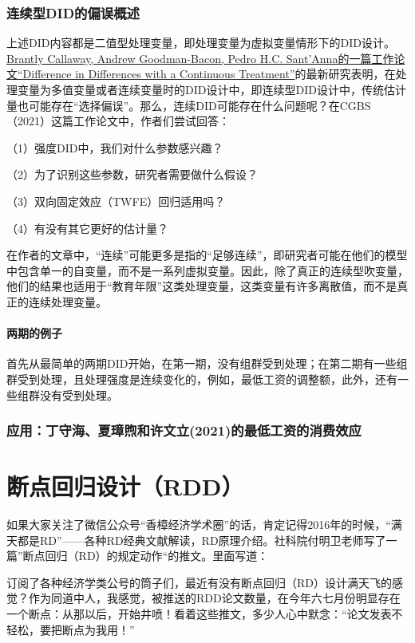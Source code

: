 \documentclass[cn,12pt,math=newtx,citestyle=gb7714-2015,bibstyle=gb7714-2015]{elegantbook}
\begin{document}
  \subsection{连续型DID的偏误概述}
  上述DID内容都是二值型处理变量，即处理变量为虚拟变量情形下的DID设计。\href{https://arxiv.org/abs/2107.02637}{Brantly Callaway, Andrew Goodman-Bacon, Pedro H.C. Sant'Anna的一篇工作论文“Difference in Differences with a Continuous Treatment”}的最新研究表明，在处理变量为多值变量或者连续变量时的DID设计中，即连续型DID设计中，传统估计量也可能存在“选择偏误”。那么，连续DID可能存在什么问题呢？在CGBS（2021）这篇工作论文中，作者们尝试回答：
  
  （1）强度DID中，我们对什么参数感兴趣？
  
  （2）为了识别这些参数，研究者需要做什么假设？
  
  （3）双向固定效应（TWFE）回归适用吗？
  
  （4）有没有其它更好的估计量？
  
  在作者的文章中，“连续”可能更多是指的“足够连续”，即研究者可能在他们的模型中包含单一的自变量，而不是一系列虚拟变量。因此，除了真正的连续型吹变量，他们的结果也适用于“教育年限”这类处理变量，这类变量有许多离散值，而不是真正的连续处理变量。
  
  \subsubsection{两期的例子}
  首先从最简单的两期DID开始，在第一期，没有组群受到处理；在第二期有一些组群受到处理，且处理强度是连续变化的，例如，最低工资的调整额，此外，还有一些组群没有受到处理。
  

  
  \subsection{应用：丁守海、夏璋煦和许文立(2021)的最低工资的消费效应}
  
  
  


	\chapter{断点回归设计（RDD）}
	
	如果大家关注了微信公众号“香樟经济学术圈”的话，肯定记得2016年的时候，“满天都是RD”——各种RD经典文献解读，RD原理介绍。社科院付明卫老师写了一篇”断点回归（RD）的规定动作“的推文。里面写道：
	
	订阅了各种经济学类公号的筒子们，最近有没有断点回归（RD）设计满天飞的感觉？作为同道中人，我感觉，被推送的RDD论文数量，在今年六七月份明显存在一个断点：从那以后，开始井喷！看着这些推文，多少人心中默念：“论文发表不轻松，要把断点为我用！”
	
\end{document}

